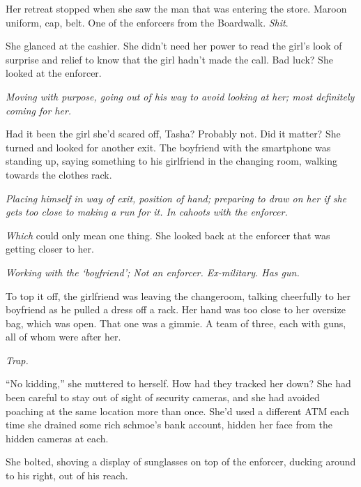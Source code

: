 Her retreat stopped when she saw the man that was entering the store.  Maroon uniform, cap, belt.  One of the enforcers from the Boardwalk.  \emph{Shit}.



She glanced at the cashier.  She didn't need her power to read the girl's look of surprise and relief to know that the girl hadn't made the call.  Bad luck?  She looked at the enforcer.



\emph{Moving with purpose, going out of his way to avoid looking at her; most definitely coming for her.}



Had it been the girl she'd scared off, Tasha?  Probably not.  Did it matter?  She turned and looked for another exit.  The boyfriend with the smartphone was standing up, saying something to his girlfriend in the changing room, walking towards the clothes rack.



\emph{Placing himself in way of exit, position of hand; preparing to draw on her if she gets too close to making a run for it.  In cahoots with the enforcer.}



\emph{Which }could only mean one thing.  She looked back at the enforcer that was getting closer to her.



\emph{Working with the `boyfriend'; Not an enforcer.  Ex-military.  Has gun.}



To top it off, the girlfriend was leaving the changeroom, talking cheerfully to her boyfriend as he pulled a dress off a rack.  Her hand was too close to her oversize bag, which was open.  That one was a gimmie.  A team of three, each with guns, all of whom were after her.



\emph{Trap.}



``No kidding,'' she muttered to herself.  How had they tracked her down?  She had been careful to stay out of sight of security cameras, and she had avoided poaching at the same location more than once.  She'd used a different ATM each time she drained some rich schmoe's bank account, hidden her face from the hidden cameras at each.



She bolted, shoving a display of sunglasses on top of the enforcer, ducking around to his right, out of his reach.



